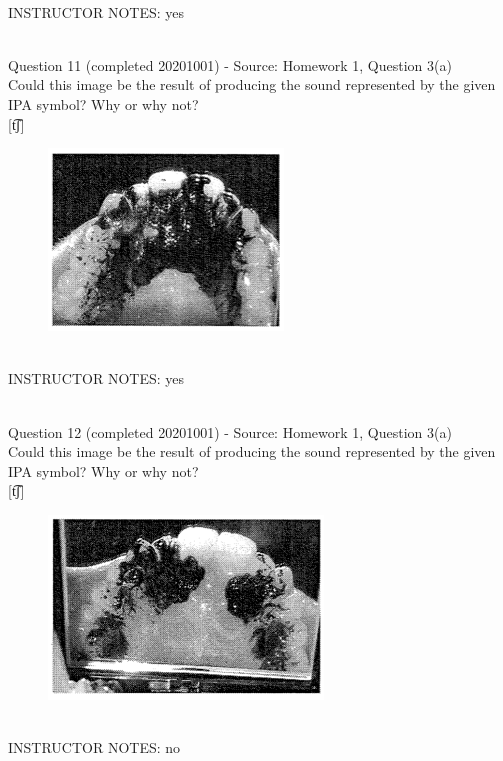 \documentclass[12pt]{article}
\begin{document}
~\\
INSTRUCTOR NOTES: yes


~\\

{\large Question 11} (completed 20201001) - Source: Homework 1, Question 3(a)\\

Could this image be the result of producing the sound represented by the given IPA symbol? Why or why not?\\

{[t͡ʃ]}

\begin{figure}[H]
\includegraphics{../images/staticpalatography_stop.png}
\end{figure}

~\\
INSTRUCTOR NOTES: yes


~\\

{\large Question 12} (completed 20201001) - Source: Homework 1, Question 3(a)\\

Could this image be the result of producing the sound represented by the given IPA symbol? Why or why not?\\

{[t͡ʃ]}

\begin{figure}[H]
\includegraphics{../images/staticpalatography_fricative.png}
\end{figure}

~\\
INSTRUCTOR NOTES: no
\end{document}
